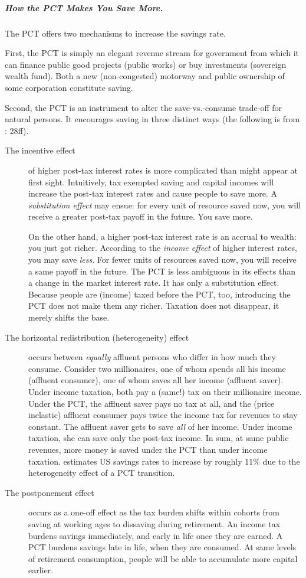 \subparagraph{How the PCT Makes You Save More.} The PCT offers two mechanisms to increase the savings rate.

First, the PCT is simply an elegant revenue stream for government from which it can finance public good projects (public works) or buy investments (sovereign wealth fund). Both a new (non-congested) motorway and public ownership of some corporation constitute saving.

Second, the PCT is an instrument to alter the save-vs.-consume trade-off for natural persons. It encourages saving in three distinct ways (the following is from \citealt{Seidman1997}: 28ff).
\begin{description}
	\item[The incentive effect] of higher post-tax interest rates is more complicated than might appear at first sight. Intuitively, tax exempted saving and capital incomes will increase the post-tax interest rates and cause people to save more. A \emph{substitution effect} may ensue: for every unit of resource saved now, you will receive a greater post-tax payoff in the future. You save more.

On the other hand, a higher post-tax interest rate is an accrual to wealth: you just got richer. According to the \emph{income effect} of higher interest rates, you may save \emph{less}. For fewer units of resources saved now, you will receive a same payoff in the future.
The PCT is less ambiguous in its effects than a change in the market interest rate. It has only a substitution effect. Because people are (income) taxed before the PCT, too, introducing the PCT does not make them any richer. Taxation does not disappear, it merely shifts the base.%
	\item[The horizontal redistribution (heterogeneity) effect] occurs between \emph{equally} affluent persons who differ in how much they consume. Consider two millionaires, one of whom spends all his income (affluent consumer), one of whom saves all her income (affluent saver). Under income taxation, both pay a (same!) tax on their millionaire income. Under the PCT, the affluent saver pays no tax at all, and the (price inelastic) affluent consumer pays twice the income tax for revenues to stay constant. The affluent saver gets to save \emph{all} of her income. Under income taxation, she can save only the post-tax income. In sum, at same public revenues, more money is saved under the PCT than under income taxation. \citeauthor{Seidman1997} estimates US savings rates to increase by roughly 11\% due to the heterogeneity effect of a PCT transition.
	\item[The postponement effect] occurs as a one-off effect as the tax burden shifts within cohorts from saving at working ages to dissaving during retirement. An income tax burdens savings immediately, and early in life once they are earned. A PCT burdens savings late in life, when they are consumed. At same levels of retirement consumption, people will be able to accumulate more capital earlier.
	

\end{description}
